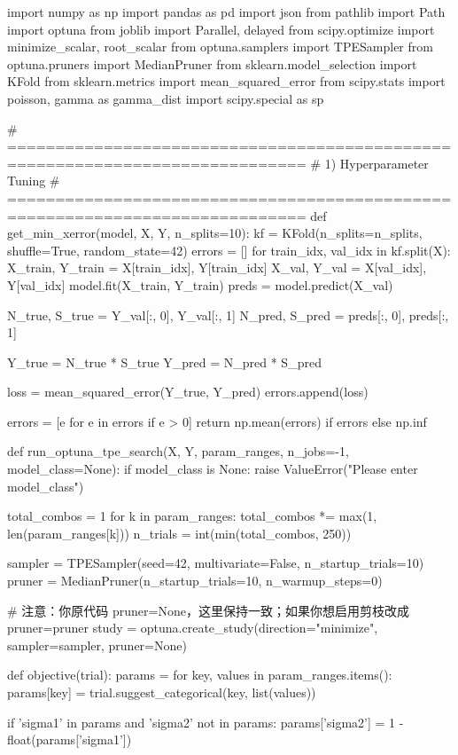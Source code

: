 import numpy as np
import pandas as pd
import json
from pathlib import Path
import optuna
from joblib import Parallel, delayed
from scipy.optimize import minimize_scalar, root_scalar
from optuna.samplers import TPESampler
from optuna.pruners import MedianPruner
from sklearn.model_selection import KFold
from sklearn.metrics import mean_squared_error
from scipy.stats import poisson, gamma as gamma_dist
import scipy.special as sp


# =============================================================================
# 1) Hyperparameter Tuning
# =============================================================================
def get_min_xerror(model, X, Y, n_splits=10):
    kf = KFold(n_splits=n_splits, shuffle=True, random_state=42)
    errors = []
    for train_idx, val_idx in kf.split(X):
        X_train, Y_train = X[train_idx], Y[train_idx]
        X_val, Y_val = X[val_idx], Y[val_idx]
        model.fit(X_train, Y_train)
        preds = model.predict(X_val)

        N_true, S_true = Y_val[:, 0], Y_val[:, 1]
        N_pred, S_pred = preds[:, 0], preds[:, 1]

        Y_true = N_true * S_true
        Y_pred = N_pred * S_pred

        loss = mean_squared_error(Y_true, Y_pred)
        errors.append(loss)

    errors = [e for e in errors if e > 0]
    return np.mean(errors) if errors else np.inf


def run_optuna_tpe_search(X, Y, param_ranges, n_jobs=-1, model_class=None):
    if model_class is None:
        raise ValueError("Please enter model_class")

    total_combos = 1
    for k in param_ranges:
        total_combos *= max(1, len(param_ranges[k]))
    n_trials = int(min(total_combos, 250))

    sampler = TPESampler(seed=42, multivariate=False, n_startup_trials=10)
    pruner  = MedianPruner(n_startup_trials=10, n_warmup_steps=0)

    # 注意：你原代码 pruner=None，这里保持一致；如果你想启用剪枝改成 pruner=pruner
    study = optuna.create_study(direction="minimize", sampler=sampler, pruner=None)

    def objective(trial):
        params = {}
        for key, values in param_ranges.items():
            params[key] = trial.suggest_categorical(key, list(values))

        if 'sigma1' in params and 'sigma2' not in params:
            params['sigma2'] = 1 - float(params['sigma1'])

